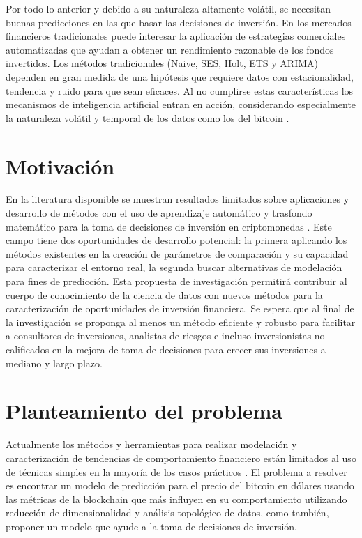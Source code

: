 Por todo lo anterior y debido a su naturaleza altamente volátil, se necesitan buenas predicciones en las que basar las decisiones de inversión. En los mercados financieros tradicionales puede interesar la aplicación de estrategias comerciales automatizadas que ayudan a obtener un rendimiento razonable de los fondos invertidos. Los métodos tradicionales (Naive, SES, Holt, ETS y ARIMA) dependen en gran medida de una hipótesis que requiere datos con estacionalidad, tendencia y ruido para que sean eficaces. Al no cumplirse estas características los mecanismos de inteligencia artificial entran en acción, considerando especialmente la naturaleza volátil y temporal de los datos como los del bitcoin \parencite{tandonBitcoinPriceForecasting2019}.

\section{Motivación}
En la literatura disponible se muestran resultados limitados sobre aplicaciones y desarrollo de métodos con el uso de aprendizaje automático y trasfondo matemático para la toma de decisiones de inversión en criptomonedas \parencite{felizardoComparativeStudyBitcoin2019,tandonBitcoinPriceForecasting2019,phaladisailoedMachineLearningModels2018}. Este campo tiene dos oportunidades de desarrollo potencial: la primera aplicando los métodos existentes en la creación de parámetros de comparación y su capacidad para caracterizar el entorno real, la segunda buscar alternativas de modelación para fines de predicción.
Esta propuesta de investigación permitirá contribuir al cuerpo de conocimiento de la ciencia de datos con nuevos métodos para la caracterización de oportunidades de inversión financiera. Se espera que al final de la investigación se proponga al menos un método eficiente y robusto para facilitar a consultores de inversiones, analistas de riesgos e incluso inversionistas no calificados en la mejora de toma de decisiones para crecer sus inversiones a mediano y largo plazo.

\section{Planteamiento del problema}
Actualmente los métodos y herramientas para realizar modelación y caracterización de tendencias de comportamiento financiero están limitados al uso de técnicas simples en la mayoría de los casos prácticos \parencite{zbikowskiApplicationMachineLearning2016}. El problema a resolver es encontrar un modelo de predicción para el precio del bitcoin en dólares usando las métricas de la blockchain que más influyen en su comportamiento utilizando reducción de dimensionalidad y análisis topológico de datos, como también, proponer un modelo que ayude a la toma de decisiones de inversión.

